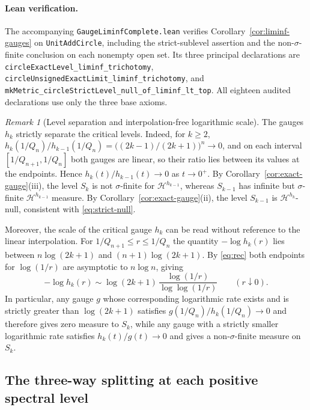 \documentclass[11pt]{article}
\theoremstyle{definition}
\theoremstyle{remark}
\newtheorem{remark}[theorem]{Remark}
\begin{document}
\paragraph{Lean verification.}
The accompanying \texttt{GaugeLiminfComplete.lean} verifies
Corollary~\ref{cor:liminf-gauges} on \texttt{UnitAddCircle}, including
the strict-sublevel assertion and the non-$\sigma$-finite conclusion on
each nonempty open set. Its three principal declarations are
\texttt{circleExactLevel\_\allowbreak liminf\_\allowbreak trichotomy},
\texttt{circleUnsigned\allowbreak ExactLimit\_\allowbreak liminf\_\allowbreak trichotomy}, and
\texttt{mkMetric\_\allowbreak circleStrictLevel\_\allowbreak null\_\allowbreak of\_\allowbreak liminf\_\allowbreak lt\_\allowbreak top}.
All eighteen audited declarations use only the three base axioms.

\begin{remark}[Level separation and interpolation-free logarithmic scale]\label{rem:gauge-scale}
The gauges $h_k$ strictly separate the critical levels. Indeed, for $k\ge2$,
$h_k(1/Q_n)/h_{k-1}(1/Q_n)=\bigl((2k-1)/(2k+1)\bigr)^n\to0$, and on each
interval $[1/Q_{n+1},1/Q_n]$ both gauges are linear, so their ratio lies
between its values at the endpoints. Hence $h_k(t)/h_{k-1}(t)\to0$ as
$t\to0^+$. By Corollary~\ref{cor:exact-gauge}(iii), the level $S_k$ is not
$\sigma$-finite for $\mathcal H^{h_{k-1}}$, whereas $S_{k-1}$ has infinite
but $\sigma$-finite $\mathcal H^{h_{k-1}}$ measure. By
Corollary~\ref{cor:exact-gauge}(ii), the level $S_{k-1}$ is
$\mathcal H^{h_k}$-null, consistent with \eqref{eq:strict-null}.

Moreover, the scale of the critical gauge $h_k$ can be read without reference
to the linear interpolation. For $1/Q_{n+1}\le r\le1/Q_n$ the quantity
$-\log h_k(r)$ lies between $n\log(2k+1)$ and $(n+1)\log(2k+1)$.
By \eqref{eq:rec} both endpoints for $\log(1/r)$ are asymptotic to
$n\log n$, giving
\[
 -\log h_k(r)\sim \log(2k+1)\,
             \frac{\log(1/r)}{\log\log(1/r)}\qquad(r\downarrow0).
\]
In particular, any gauge $g$ whose corresponding logarithmic rate exists and is
strictly greater than $\log(2k+1)$ satisfies $g(1/Q_n)/h_k(1/Q_n)\to0$ and
therefore gives zero measure to $S_k$, while any gauge with a strictly smaller
logarithmic rate satisfies $h_k(t)/g(t)\to0$ and gives a non-$\sigma$-finite
measure on $S_k$.
\end{remark}

\subsection{The three-way splitting at each positive spectral level}
\end{document}
